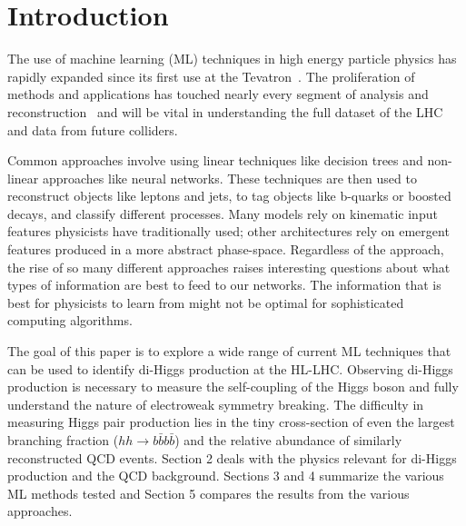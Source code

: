 \section{Introduction}
\label{sec:intro}

The use of machine learning (ML) techniques in high energy particle physics has rapidly expanded since its first use at the Tevatron~\cite{Abazov:2006gd, Aaltonen:2008sy}. The proliferation of methods and applications has touched nearly every segment of analysis and reconstruction~\cite{albertsson2018machine} and will be vital in understanding the full dataset of the LHC and data from future colliders.

Common approaches involve using linear techniques like decision trees and non-linear approaches like neural networks. These techniques are then used to reconstruct objects like leptons and jets, to tag objects like b-quarks or boosted decays, and classify different processes. Many models rely on kinematic input features physicists have traditionally used; other architectures rely on emergent features produced in a more abstract phase-space. Regardless of the approach, the rise of so many different approaches raises interesting questions about what types of information are best to feed to our networks.   The information that is best for physicists to learn from might not be optimal for sophisticated computing algorithms.

The goal of this paper is to explore a wide range of current ML techniques that can be used to identify di-Higgs production at the HL-LHC. Observing di-Higgs production is necessary to measure the self-coupling of the Higgs boson and fully understand the nature of electroweak symmetry breaking. The difficulty in measuring Higgs pair production lies in the tiny cross-section of even the largest branching fraction ($hh\rightarrow b\bar{b}b\bar{b}$) and the relative abundance of similarly reconstructed QCD events. Section 2 deals with the physics relevant for di-Higgs production and the QCD background. Sections 3 and 4 summarize the various ML methods tested and Section 5 compares the results from the various approaches.
